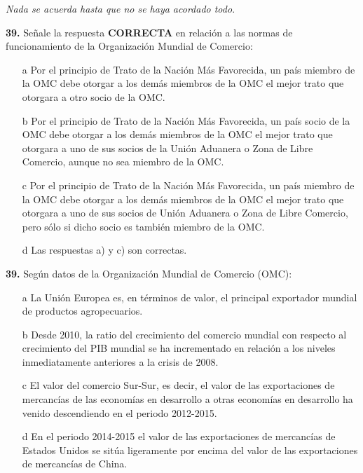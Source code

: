 \documentclass{nuevotema}
\begin{document}

\textit{Nada se acuerda hasta que no se haya acordado todo}. 

\preguntas


\textbf{39.} Señale la respuesta \textbf{CORRECTA} en relación a las normas de funcionamiento de la Organización Mundial de Comercio:

\begin{itemize}
	\item[a] Por el principio de Trato de la Nación Más Favorecida, un país miembro de la OMC debe otorgar a los demás miembros de la OMC el mejor trato que otorgara a otro socio de la OMC.
	\item[b] Por el principio de Trato de la Nación Más Favorecida, un país socio de la OMC debe otorgar a los demás miembros de la OMC el mejor trato que otorgara a uno de sus socios de la Unión Aduanera o Zona de Libre Comercio, aunque no sea miembro de la OMC.
	\item[c] Por el principio de Trato de la Nación Más Favorecida, un país miembro de la OMC debe otorgar a los demás miembros de la OMC el mejor trato que otorgara a uno de sus socios de Unión Aduanera o Zona de Libre Comercio, pero sólo si dicho socio es también miembro de la OMC. 
	\item[d] Las respuestas a) y c) son correctas.
\end{itemize}

\textbf{39.} Según datos de la Organización Mundial de Comercio (OMC):

\begin{itemize}
	\item[a] La Unión Europea es, en términos de valor, el principal exportador mundial de productos agropecuarios.
	\item[b] Desde 2010, la ratio del crecimiento del comercio mundial con respecto al crecimiento del PIB mundial se ha incrementado en relación a los niveles inmediatamente anteriores a la crisis de 2008.
	\item[c] El valor del comercio Sur-Sur, es decir, el valor de las exportaciones de mercancías de las economías en desarrollo a otras economías en desarrollo ha venido descendiendo en el periodo 2012-2015.
	\item[d] En el periodo 2014-2015 el valor de las exportaciones de mercancías de Estados Unidos se sitúa ligeramente por encima del valor de las exportaciones de mercancías de China.
\end{itemize}
\end{document}
